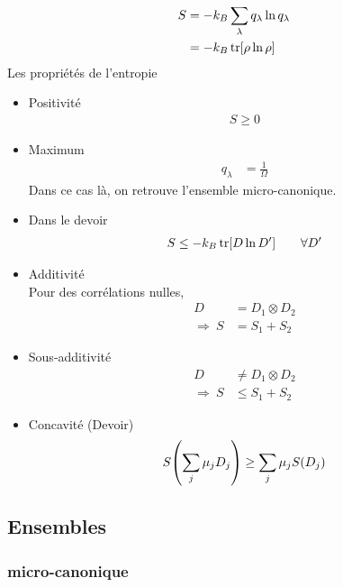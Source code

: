 \begin{align}
    S&=-k_B\sum_\lambda q_\lambda\ln q_\lambda\\
     &=-k_B\trace[\rho\ln\rho]
\end{align}
Les propriétés de l'entropie
\begin{itemize}
    \item Positivité
        \begin{align}
            S\geq0
        \end{align}
    \item Maximum
        \begin{align}
            q_\lambda&=\frac1\Omega
        \end{align}
        Dans ce cas là, on retrouve l'ensemble micro-canonique.
    \item Dans le devoir
        \begin{align}
            S\leq-k_B\trace[D\ln D']\qquad\forall D'
        \end{align}
    \item Additivité\\
        Pour des corrélations nulles,
        \begin{align}
            D&=D_1\otimes D_2\\
            \Rightarrow\ S&=S_1+S_2
        \end{align}
    \item Sous-additivité
        \begin{align}
            D&\neq D_1\otimes D_2\\
            \Rightarrow\ S&\leq S_1+S_2
        \end{align}
    \item Concavité (Devoir)
        \begin{align}
            S\qty(\sum_j\mu_jD_j)\geq\sum_j\mu_jS(D_j)
        \end{align}
\end{itemize}

\subsection{Ensembles} %
\label{sub:Ensembles}

\subsubsection{micro-canonique} %
\label{sec:micro-canonique}

